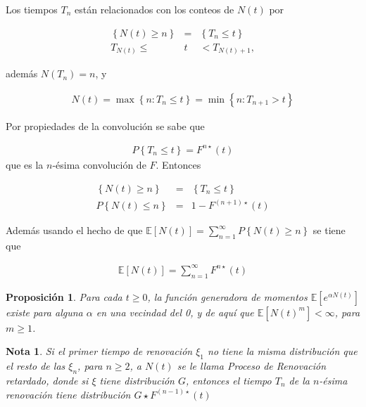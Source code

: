 \documentclass{article}
\newtheorem{Note}{Nota}
\newtheorem{Prop}{Proposición}
\newcommand{\esp}{\mathbb{E}}
\begin{document}
Los tiempos $T_{n}$ est\'an relacionados con los conteos de $N\left(t\right)$ por

\begin{eqnarray*}
\left\{N\left(t\right)\geq n\right\}&=&\left\{T_{n}\leq t\right\}\\
T_{N\left(t\right)}\leq &t&<T_{N\left(t\right)+1},
\end{eqnarray*}

adem\'as $N\left(T_{n}\right)=n$, y 

\begin{eqnarray*}
N\left(t\right)=\max\left\{n:T_{n}\leq t\right\}=\min\left\{n:T_{n+1}>t\right\}
\end{eqnarray*}

Por propiedades de la convoluci\'on se sabe que

\begin{eqnarray*}
P\left\{T_{n}\leq t\right\}=F^{n\star}\left(t\right)
\end{eqnarray*}
que es la $n$-\'esima convoluci\'on de $F$. Entonces 

\begin{eqnarray*}
\left\{N\left(t\right)\geq n\right\}&=&\left\{T_{n}\leq t\right\}\\
P\left\{N\left(t\right)\leq n\right\}&=&1-F^{\left(n+1\right)\star}\left(t\right)
\end{eqnarray*}

Adem\'as usando el hecho de que $\esp\left[N\left(t\right)\right]=\sum_{n=1}^{\infty}P\left\{N\left(t\right)\geq n\right\}$
se tiene que

\begin{eqnarray*}
\esp\left[N\left(t\right)\right]=\sum_{n=1}^{\infty}F^{n\star}\left(t\right)
\end{eqnarray*}

\begin{Prop}
Para cada $t\geq0$, la funci\'on generadora de momentos $\esp\left[e^{\alpha N\left(t\right)}\right]$ existe para alguna $\alpha$ en una vecindad del 0, y de aqu\'i que $\esp\left[N\left(t\right)^{m}\right]<\infty$, para $m\geq1$.
\end{Prop}


\begin{Note}
Si el primer tiempo de renovaci\'on $\xi_{1}$ no tiene la misma distribuci\'on que el resto de las $\xi_{n}$, para $n\geq2$, a $N\left(t\right)$ se le llama Proceso de Renovaci\'on retardado, donde si $\xi$ tiene distribuci\'on $G$, entonces el tiempo $T_{n}$ de la $n$-\'esima renovaci\'on tiene distribuci\'on $G\star F^{\left(n-1\right)\star}\left(t\right)$
\end{Note}
\end{document}
